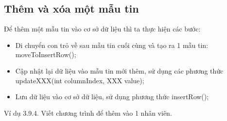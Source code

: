 \subsection{Thêm và xóa một mẫu tin}
Để thêm một mẫu tin vào cơ sở dữ liệu thì ta thực hiện các bước:
\begin{itemize}
	\item Di chuyển con trỏ về sau mẫu tin cuối cùng và tạo ra 1 mẫu tin: moveToInsertRow();
	\item Cập nhật lại dữ liệu vào mẫu tin mới thêm, sử dụng các phương thức updateXXX(int columnIndex, XXX value);
	\item Lưu dữ liệu vào cơ sở dữ liệu, sử dụng phương thức insertRow();
\end{itemize}
Ví dụ 3.9.4. Viết chương trình để thêm vào 1 nhân viên.
